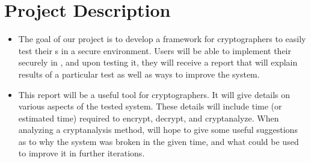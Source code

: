 \section{Project Description}


\begin{itemize}
\item The goal of our project is to develop a framework
  for cryptographers to easily test their \cs s in a secure
  environment. Users will be able to implement their \cs{}
  securely in \cry, and upon testing it, they will receive a
  report that will explain results of a particular test as
  well as ways to improve the system.
\item This report will be a useful tool for
  cryptographers. It will give details on various aspects of
  the tested system. These details will include time (or
  estimated time) required to encrypt, decrypt, and
  cryptanalyze. When analyzing a cryptanalysis method,
  \cry{} will hope to give some useful suggestions as to why
  the system was broken in the given time, and what could be
  used to improve it in further iterations.
\end{itemize}
